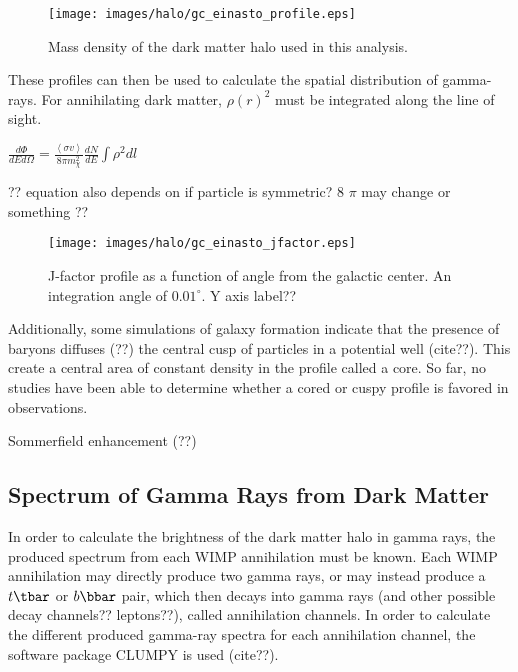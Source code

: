     \begin{figure}[ht]
      \begin{center}
        \texttt{[image: images/halo/gc\_einasto\_profile.eps]}
        \caption[Galactic Center Einasto Halo Density]{Mass density of the dark matter halo used in this analysis.}\label{fig:gchalo_density}
      \end{center}
    \end{figure}
    
    These profiles can then be used to calculate the spatial distribution of gamma-rays.
    For annihilating dark matter, $\rho\left(r\right)^2$ must be integrated along the line of sight.

    $ \frac{d\Phi}{dE d\Omega}= \frac{ \left \langle \sigma v \right \rangle }{8 \pi m_\chi^2} \frac{dN}{dE} \int \rho^2 dl $ \label{eqn:dmflux}

    ?? equation also depends on if particle is symmetric? 8 $\pi$ may change or something ??
    
    \begin{figure}[ht]
      \begin{center}
        \texttt{[image: images/halo/gc\_einasto\_jfactor.eps]}
        \caption[Galactic Center Einasto Halo Jfactor]{J-factor profile as a function of angle from the galactic center.  An integration angle of ${0.01}^{\circ}$. Y axis label?? }\label{fig:gchalo_jfactor}
      \end{center}
    \end{figure}
    
    Additionally, some simulations of galaxy formation indicate that the presence of baryons diffuses (??) the central cusp of particles in a potential well (cite??).
    This create a central area of constant density in the profile called a core.
    So far, no studies have been able to determine whether a cored or cuspy profile is favored in observations.

    Sommerfield enhancement (??)
    
  \subsection{Spectrum of Gamma Rays from Dark Matter}
    In order to calculate the brightness of the dark matter halo in gamma rays, the produced spectrum from each WIMP annihilation must be known.
    Each WIMP annihilation may directly produce two gamma rays, or may instead produce a $t\tbar$ or $b\bbar$ pair, which then decays into gamma rays (and other possible decay channels?? leptons??), called annihilation channels.
    In order to calculate the different produced gamma-ray spectra for each annihilation channel, the software package CLUMPY is used (cite??).

